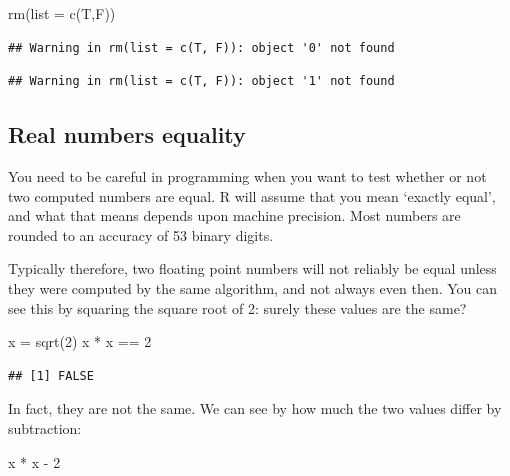 \documentclass[
]{book}
\newenvironment{Shaded}{\begin{snugshade}}{\end{snugshade}}
\newcommand{\AttributeTok}[1]{\textcolor[rgb]{0.77,0.63,0.00}{#1}}
\newcommand{\DecValTok}[1]{\textcolor[rgb]{0.00,0.00,0.81}{#1}}
\newcommand{\FunctionTok}[1]{\textcolor[rgb]{0.00,0.00,0.00}{#1}}
\newcommand{\NormalTok}[1]{#1}
\newcommand{\OtherTok}[1]{\textcolor[rgb]{0.56,0.35,0.01}{#1}}
\newcommand{\SpecialCharTok}[1]{\textcolor[rgb]{0.00,0.00,0.00}{#1}}
\begin{document}
\begin{Shaded}
\begin{Highlighting}[]
\FunctionTok{rm}\NormalTok{(}\AttributeTok{list =} \FunctionTok{c}\NormalTok{(T,F))}
\end{Highlighting}
\end{Shaded}

\begin{verbatim}
## Warning in rm(list = c(T, F)): object '0' not found
\end{verbatim}

\begin{verbatim}
## Warning in rm(list = c(T, F)): object '1' not found
\end{verbatim}

\hypertarget{real-numbers-equality}{%
\subsection{Real numbers equality}\label{real-numbers-equality}}

You need to be careful in programming when you want to test whether or not two computed numbers are equal. R will assume that you mean `exactly equal', and what that means depends upon machine precision. Most numbers are rounded to an accuracy of 53 binary digits.

Typically therefore, two floating point numbers will not reliably be equal unless they were computed by the same algorithm, and not always even then. You can see this by squaring the square root of 2: surely these values are the same?

\begin{Shaded}
\begin{Highlighting}[]
\NormalTok{x }\OtherTok{=} \FunctionTok{sqrt}\NormalTok{(}\DecValTok{2}\NormalTok{)}
\NormalTok{x }\SpecialCharTok{*}\NormalTok{ x }\SpecialCharTok{==} \DecValTok{2}
\end{Highlighting}
\end{Shaded}

\begin{verbatim}
## [1] FALSE
\end{verbatim}

In fact, they are not the same. We can see by how much the two values differ by subtraction:

\begin{Shaded}
\begin{Highlighting}[]
\NormalTok{x }\SpecialCharTok{*}\NormalTok{ x }\SpecialCharTok{{-}} \DecValTok{2}
\end{Highlighting}
\end{Shaded}
\end{document}
